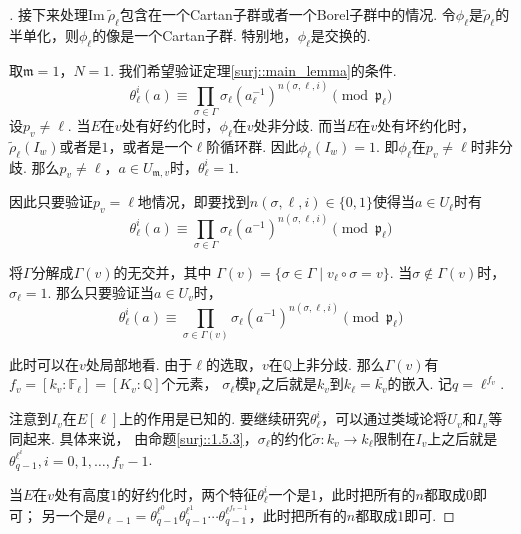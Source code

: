 \begin{proof}[]
    \vskip0.3cm

    接下来处理$\mathrm{Im}\ \tilde{\rho}_{\ell}$包含在一个Cartan子群或者一个Borel子群中的情况.
    令$\phi_{\ell}$是$\tilde{\rho}_{\ell}$的半单化，则$\phi_{\ell}$的像是一个Cartan子群.
    特别地，$\phi_{\ell}$是交换的.

    取$\mathfrak{m}=1$，$N=1$. 我们希望验证定理\ref{surj::main_lemma}的条件.
    \begin{equation}
        \theta_{\ell}^i (a) \equiv \prod_{\sigma\in \Gamma} \sigma_{\ell}(a_{\ell}^{-1})^{n(\sigma, \ell,i)}
        \pmod{\mathfrak{p}_{\ell}}
    \end{equation}
    设$p_v\neq \ell$. 当$E$在$v$处有好约化时，$\phi_{\ell}$在$v$处非分歧.
    而当$E$在$v$处有坏约化时，$\tilde{\rho}_{\ell}(I_w)$或者是$1$，或者是一个$\ell$阶循环群.
    因此$\phi_{\ell}(I_w)=1$. 即$\phi_{\ell}$在$p_v\neq \ell$时非分歧.
    那么$p_v\neq \ell$，$a\in U_{\mathfrak{m}, v}$时，$\theta_{\ell}^{i} = 1$.

    因此只要验证$p_v=\ell$地情况，即要找到$n(\sigma, \ell,i)\in \{0, 1\}$使得当$a\in U_{\ell}$时有
    \begin{equation}
        \theta_{\ell}^i (a) \equiv \prod_{\sigma\in \Gamma} \sigma_{\ell}(a^{-1})^{n(\sigma, \ell,i)}
        \pmod{\mathfrak{p}_{\ell}}
    \end{equation}

    将$\Gamma$分解成$\Gamma(v)$的无交并，其中
    $\Gamma(v) = \{\sigma\in \Gamma\mid v_{\ell}\circ\sigma = v\}$.
    当$\sigma\not\in \Gamma(v)$时，$\sigma_{\ell} = 1$.
    那么只要验证当$a\in U_v$时，
    \begin{equation}
        \theta_{\ell}^i (a) \equiv \prod_{\sigma\in \Gamma(v)} \sigma_{\ell}(a^{-1})^{n(\sigma,\ell,i)}
        \pmod{\mathfrak{p}_{\ell}}
    \end{equation}
    
    此时可以在$v$处局部地看.
    由于$\ell$的选取，$v$在$\mathbb{Q}$上非分歧.
    那么$\Gamma(v)$有$f_v = [k_v:\mathbb{F}_{\ell}] = [K_v:\mathbb{Q}]$个元素，
    $\sigma_{\ell}$模$\mathfrak{p}_{\ell}$之后就是$k_v$到$k_{\ell}=\overline{k_v}$的嵌入. 记$q=\ell^{f_v}$.

    注意到$I_v$在$E[\ell]$上的作用是已知的.
    要继续研究$\theta_{\ell}^{i}$，可以通过类域论将$U_v$和$I_v$等同起来. 具体来说，
    由命题\ref{surj::1.5.3}，$\sigma_{\ell}$的约化$\tilde{\sigma}:k_v\to k_{\ell}$限制在$I_v$上之后就是$\theta_{q-1}^{\ell^i},i=0,1,\ldots,f_v-1$.

    当$E$在$v$处有高度$1$的好约化时，两个特征$\theta_{\ell}^i$一个是$1$，此时把所有的$n$都取成$0$即可；
    另一个是$\theta_{\ell - 1} = \theta_{q-1}^{\ell^0} \theta_{q-1}^{\ell^1}\cdots \theta_{q-1}^{\ell^{f_v-1}}$，此时把所有的$n$都取成$1$即可.


\end{proof}
